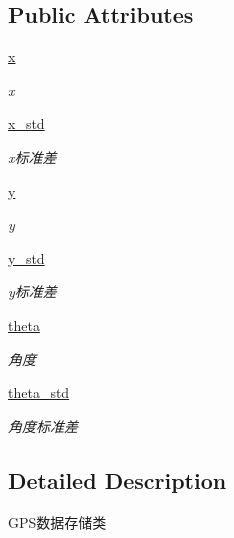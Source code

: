 \subsection*{Public Attributes}
\begin{DoxyCompactItemize}
\item 
\hyperlink{classfuse___g___a__dox_1_1_g_p_s__unit_a7b9267f80aaaa4bf4723bfd7a94283b5}{x}
\begin{DoxyCompactList}\small\item\em x \end{DoxyCompactList}\item 
\hyperlink{classfuse___g___a__dox_1_1_g_p_s__unit_ab130db906b1f542d0dce2aaccfa9297f}{x\+\_\+std}
\begin{DoxyCompactList}\small\item\em x标准差 \end{DoxyCompactList}\item 
\hyperlink{classfuse___g___a__dox_1_1_g_p_s__unit_a496a2def07de8b075d8c99cc1056c07e}{y}
\begin{DoxyCompactList}\small\item\em y \end{DoxyCompactList}\item 
\hyperlink{classfuse___g___a__dox_1_1_g_p_s__unit_ad872d2a6a5596e287c138aef6082e6ae}{y\+\_\+std}
\begin{DoxyCompactList}\small\item\em y标准差 \end{DoxyCompactList}\item 
\hyperlink{classfuse___g___a__dox_1_1_g_p_s__unit_ab848ec313c0eef141c37505721a05987}{theta}
\begin{DoxyCompactList}\small\item\em 角度 \end{DoxyCompactList}\item 
\hyperlink{classfuse___g___a__dox_1_1_g_p_s__unit_afe1d002e574689b63e355a45af8991f3}{theta\+\_\+std}
\begin{DoxyCompactList}\small\item\em 角度标准差 \end{DoxyCompactList}\end{DoxyCompactItemize}


\subsection{Detailed Description}
G\+P\+S数据存储类 



